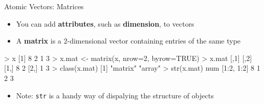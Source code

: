 \documentclass[
  ignorenonframetext,
]{beamer}
\newenvironment{Shaded}{\begin{snugshade}}{\end{snugshade}}
\newcommand{\AttributeTok}[1]{\textcolor[rgb]{0.77,0.63,0.00}{#1}}
\newcommand{\ConstantTok}[1]{\textcolor[rgb]{0.00,0.00,0.00}{#1}}
\newcommand{\DecValTok}[1]{\textcolor[rgb]{0.00,0.00,0.81}{#1}}
\newcommand{\FunctionTok}[1]{\textcolor[rgb]{0.00,0.00,0.00}{#1}}
\newcommand{\NormalTok}[1]{#1}
\newcommand{\OtherTok}[1]{\textcolor[rgb]{0.56,0.35,0.01}{#1}}
\newcommand{\SpecialCharTok}[1]{\textcolor[rgb]{0.00,0.00,0.00}{#1}}
\newcommand{\StringTok}[1]{\textcolor[rgb]{0.31,0.60,0.02}{#1}}
\providecommand{\tightlist}{%
  \setlength{\itemsep}{0pt}\setlength{\parskip}{0pt}}
\begin{document}
\begin{frame}[fragile]{Atomic Vectors: Matrices}
\protect\hypertarget{atomic-vectors-matrices}{}
\begin{itemize}[<+->]
\tightlist
\item
  You can add \textbf{attributes}, such as \textbf{dimension}, to
  vectors
\item
  A \textbf{matrix} is a 2-dimensional vector containing entries of the
  same type
\end{itemize}

\begin{Shaded}
\begin{Highlighting}[]
\SpecialCharTok{\textgreater{}}\NormalTok{ x}
\NormalTok{[}\DecValTok{1}\NormalTok{] }\DecValTok{8} \DecValTok{2} \DecValTok{1} \DecValTok{3}
\SpecialCharTok{\textgreater{}}\NormalTok{ x.mat }\OtherTok{\textless{}{-}} \FunctionTok{matrix}\NormalTok{(x, }\AttributeTok{nrow=}\DecValTok{2}\NormalTok{, }\AttributeTok{byrow=}\ConstantTok{TRUE}\NormalTok{)}
\SpecialCharTok{\textgreater{}}\NormalTok{ x.mat}
\NormalTok{     [,}\DecValTok{1}\NormalTok{] [,}\DecValTok{2}\NormalTok{]}
\NormalTok{[}\DecValTok{1}\NormalTok{,]    }\DecValTok{8}    \DecValTok{2}
\NormalTok{[}\DecValTok{2}\NormalTok{,]    }\DecValTok{1}    \DecValTok{3}
\SpecialCharTok{\textgreater{}} \FunctionTok{class}\NormalTok{(x.mat)}
\NormalTok{[}\DecValTok{1}\NormalTok{] }\StringTok{"matrix"} \StringTok{"array"} 
\SpecialCharTok{\textgreater{}} \FunctionTok{str}\NormalTok{(x.mat)}
\NormalTok{ num [}\DecValTok{1}\SpecialCharTok{:}\DecValTok{2}\NormalTok{, }\DecValTok{1}\SpecialCharTok{:}\DecValTok{2}\NormalTok{] }\DecValTok{8} \DecValTok{1} \DecValTok{2} \DecValTok{3}
\end{Highlighting}
\end{Shaded}

\begin{itemize}[<+->]
\tightlist
\item
  Note: \texttt{str} is a handy way of dispalying the structure of
  objects
\end{itemize}
\end{frame}
\end{document}

